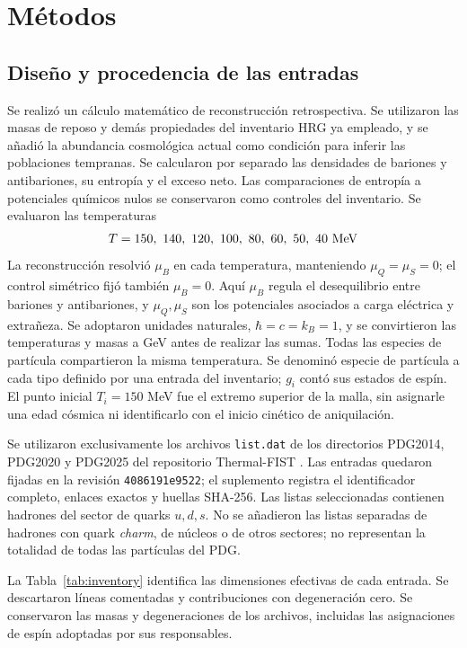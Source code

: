 \section{Métodos}
\subsection{Diseño y procedencia de las entradas}
Se realizó un cálculo matemático de reconstrucción retrospectiva. Se utilizaron las masas de reposo y demás propiedades del inventario HRG ya empleado, y se añadió la abundancia cosmológica actual como condición para inferir las poblaciones tempranas. Se calcularon por separado las densidades de bariones y antibariones, su entropía y el exceso neto. Las comparaciones de entropía a potenciales químicos nulos se conservaron como controles del inventario. Se evaluaron las temperaturas
\[
T=150,\ 140,\ 120,\ 100,\ 80,\ 60,\ 50,\ 40\ {\rm MeV}
\]
La reconstrucción resolvió $\mu_B$ en cada temperatura, manteniendo $\mu_Q=\mu_S=0$; el control simétrico fijó también $\mu_B=0$. Aquí $\mu_B$ regula el desequilibrio entre bariones y antibariones, y $\mu_Q,\mu_S$ son los potenciales asociados a carga eléctrica y extrañeza. Se adoptaron unidades naturales, $\hbar=c=k_B=1$, y se convirtieron las temperaturas y masas a GeV antes de realizar las sumas. Todas las especies de partícula compartieron la misma temperatura. Se denominó especie de partícula a cada tipo definido por una entrada del inventario; $g_i$ contó sus estados de espín. El punto inicial $T_i=150$ MeV fue el extremo superior de la malla, sin asignarle una edad cósmica ni identificarlo con el inicio cinético de aniquilación.

Se utilizaron exclusivamente los archivos \texttt{list.dat} de los directorios PDG2014, PDG2020 y PDG2025 del repositorio Thermal-FIST \citep{TFLists2026}. Las entradas quedaron fijadas en la revisión \texttt{4086191e9522}; el suplemento registra el identificador completo, enlaces exactos y huellas SHA-256. Las listas seleccionadas contienen hadrones del sector de quarks $u,d,s$. No se añadieron las listas separadas de hadrones con quark \emph{charm}, de núcleos o de otros sectores; no representan la totalidad de todas las partículas del PDG.

La Tabla~\ref{tab:inventory} identifica las dimensiones efectivas de cada entrada. Se descartaron líneas comentadas y contribuciones con degeneración cero. Se conservaron las masas y degeneraciones de los archivos, incluidas las asignaciones de espín adoptadas por sus responsables.


